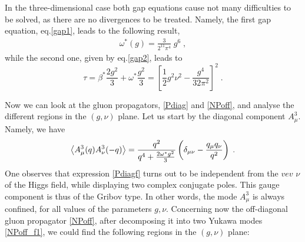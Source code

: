 In the three-dimensional case both gap equations cause not many difficulties to be solved, as there are no divergences to be treated. Namely, the first gap equation, eq.\eqref{gap1}, leads to the following result,
\begin{eqnarray}
\omega^*(g)= \frac{3}{2^{11}\pi^4} \;g^6        \;,  \label{omega}
\end{eqnarray}
while the second one, given by eq.\eqref{gap2}, leads to
\begin{equation}
\tau =\beta^* \frac{2g^{2}}{3}+\omega^* \frac{g^{2}}{3}  = \left[ \frac{1}{2}g^{2}\nu^{2}-\frac{g^{4}}{32\pi^2 }\right] ^{2}  \;. \label{feq}
\end{equation}

Now we can look at the gluon propagators, \eqref{Pdiag} and \eqref{NPoff}, and analyse the different regions in the $(g,\nu)$ plane. Let us start by the diagonal component $A^3_\mu$. Namely, we have
\begin{equation}
\left\langle A_{\mu }^{3}(q)A_{\nu }^{3}(-q)\right\rangle =\frac{q^{2}}{%
q^{4}+\frac{2\omega^* g^{2}}{3}}\left( \delta _{\mu \nu }-\frac{q_{\mu }q_{\nu
}}{q^{2}}\right)  \label{Pdiagf} \;.
\end{equation}
One observes that expression \eqref{Pdiagf} turns out to be independent from the $vev$ $\nu$ of the Higgs field, while displaying two complex conjugate poles. This gauge component is thus of the Gribov type. In other words, the mode $A^3_\mu$ is always confined, for all values of the parameters $g, \nu$. Concerning now the off-diagonal gluon propagator \eqref{NPoff}, after decomposing it into two Yukawa modes  \eqref{NPoff_f1}, we could find the following regions in the $(g,\nu)$ plane:


